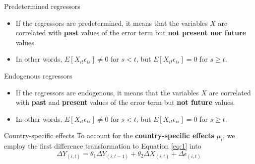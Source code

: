 \documentclass[color=usenames,dvipsnames]{beamer}
\begin{document}
\begin{frame}{Predetermined regressors}
    \begin{itemize}
    
        \item If the regressors are predetermined, it means that the variables \(X\) are correlated with \textbf{past} values of the error term but \textbf{not present nor future} values.
        
        \item In other words, \(E[X_{it} \epsilon_{is}] \neq 0\) for \(s < t\), but \(E[X_{it} \epsilon_{is}] = 0\) for \(s \ge t\).
    
    \end{itemize}

\end{frame}

\begin{frame}{Endogenous regressors}
    \begin{itemize}
    
        \item If the regressors are endogenous, it means that the variables \(X\) are correlated with \textbf{past} and \textbf{present} values of the error term but \textbf{not future} values.
        
        \item In other words, \(E[X_{it} \epsilon_{is}] \neq 0\) for \(s < t\), but \(E[X_{it} \epsilon_{is}] = 0\) for \(s \ge t\).
    
    \end{itemize}

\end{frame}

\begin{frame}{Country-specific effects}
    To account for the \textbf{country-specific effects} \(\mu_i\), we employ the first difference transformation to Equation \ref{eq:1} into
    \[
    \Delta Y_{(i,t)} = \theta_1 \Delta Y_{(i,t-1)} + \theta_2 \Delta X_{(i,t)} + \Delta \epsilon_{(i,t)}
    \]
\end{frame}
\end{document}
